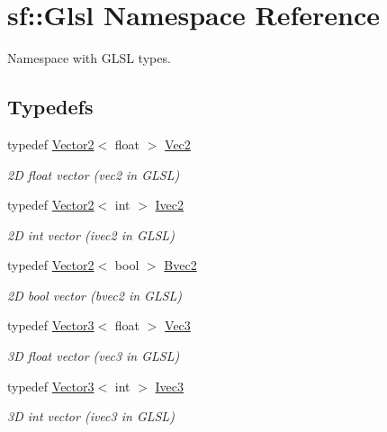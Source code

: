 \hypertarget{namespacesf_1_1_glsl}{}\section{sf\+:\+:Glsl Namespace Reference}
\label{namespacesf_1_1_glsl}


Namespace with G\+L\+SL types.  


\subsection*{Typedefs}
\begin{DoxyCompactItemize}
\item 
typedef \mbox{\hyperlink{classsf_1_1_vector2}{Vector2}}$<$ float $>$ \mbox{\hyperlink{namespacesf_1_1_glsl_adeed356d346d87634b4c197a530e4edf}{Vec2}}
\begin{DoxyCompactList}\small\item\em 2D float vector ({\ttfamily vec2} in G\+L\+SL) \end{DoxyCompactList}\item 
typedef \mbox{\hyperlink{classsf_1_1_vector2}{Vector2}}$<$ int $>$ \mbox{\hyperlink{namespacesf_1_1_glsl_aab803ee70c4b7bfcd63ec09e10408fd3}{Ivec2}}
\begin{DoxyCompactList}\small\item\em 2D int vector ({\ttfamily ivec2} in G\+L\+SL) \end{DoxyCompactList}\item 
typedef \mbox{\hyperlink{classsf_1_1_vector2}{Vector2}}$<$ bool $>$ \mbox{\hyperlink{namespacesf_1_1_glsl_a59d8cf909c3d71ebf3db057480b464da}{Bvec2}}
\begin{DoxyCompactList}\small\item\em 2D bool vector ({\ttfamily bvec2} in G\+L\+SL) \end{DoxyCompactList}\item 
typedef \mbox{\hyperlink{classsf_1_1_vector3}{Vector3}}$<$ float $>$ \mbox{\hyperlink{namespacesf_1_1_glsl_a9bdd0463b7cb5316244a082007bd50f0}{Vec3}}
\begin{DoxyCompactList}\small\item\em 3D float vector ({\ttfamily vec3} in G\+L\+SL) \end{DoxyCompactList}\item 
typedef \mbox{\hyperlink{classsf_1_1_vector3}{Vector3}}$<$ int $>$ \mbox{\hyperlink{namespacesf_1_1_glsl_a64f403dd0219e7f128ffddca641394df}{Ivec3}}
\begin{DoxyCompactList}\small\item\em 3D int vector ({\ttfamily ivec3} in G\+L\+SL) \end{DoxyCompactList}\item 

\end{DoxyCompactItemize}
